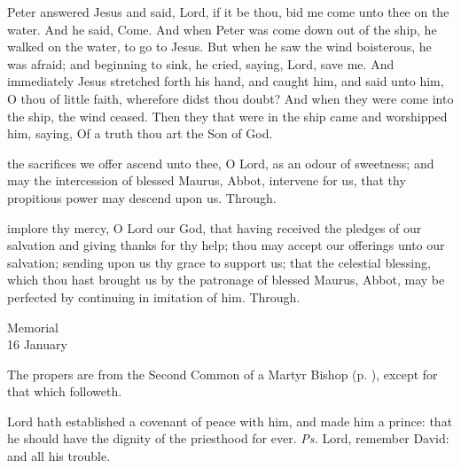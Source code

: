 Peter answered Jesus and said, Lord, if it be thou, bid me come unto thee on the water. And he said, Come. And when Peter was come down out of the ship, he walked on the water, to go to Jesus. But when he saw the wind boisterous, he was afraid; and beginning to sink, he cried, saying, Lord, save me. And immediately Jesus stretched forth his hand, and caught him, and said unto him, O thou of little faith, wherefore didst thou doubt? And when they were come into the ship, the wind ceased. Then they that were in the ship came and worshipped him, saying, Of a truth thou art the Son of God.


\secret
{} the sacrifices we offer ascend unto thee, O Lord, as an odour of sweetness; and may the intercession of blessed Maurus, Abbot, intervene for us, that thy propitious power may descend upon us. Through.


\postcommunion
{} implore thy mercy, O Lord our God, that having received the pledges of our salvation and giving thanks for thy help; thou may accept our offerings unto our salvation; sending upon us thy grace to support us; that the celestial blessing, which thou hast brought us by the patronage of blessed Maurus, Abbot, may be perfected by continuing in imitation of him. Through.


\begin{inhead}
    {Memorial\\
16 January}
\end{inhead}

\begin{rubric}
	The propers are from the Second Common of a Martyr Bishop (p. \pageref{CommonMartyrBishopII}), except for that which followeth.
\end{rubric}

\introit
{} Lord hath established a covenant of peace with him, and made him a prince: that he should have the dignity of the priesthood for ever. \textit{Ps.} Lord, remember David: and all his trouble.

